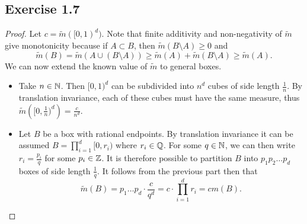 \documentclass[hw_all.tex]{subfiles}
\begin{document}
\subsection{Exercise 1.7}

\begin{proof}
    Let $c = \tilde{m}([0,1)^d)$. Note that finite additivity and non-negativity of $\tilde{m}$ give monotonicity because if $A \subset B$, then $\tilde{m}(B \setminus A) \geq 0$ and 
    \[
        \tilde{m}(B) = \tilde{m}(A \cup (B \setminus A)) \geq \tilde{m}(A) + \tilde{m}(B \setminus A) \geq \tilde{m}(A)
    .\]
    We can now extend the known value of $\tilde{m}$ to general boxes.
    \begin{itemize}
        \item 
            Take $n \in \mathbb{N}$. Then $[0,1)^d$ can be subdivided into $n^d$ cubes of side length $\frac{1}{n}$. By translation invariance, each of these cubes must have the same measure, thus $\tilde{m} \left([0, \frac{1}{n})^d\right) = \frac{c}{n^d}$. 

        \item
            Let $B$ be a box with rational endpoints. By translation invariance it can be assumed $B = \prod_{i=1}^d [0, r_i)$ where $r_i \in \mathbb{Q}$. For some $q \in \mathbb{N}$, we can then write $r_i = \frac{p_i}{q}$ for some $p_i \in \mathbb{Z}$. It is therefore possible to partition $B$ into $p_1 p_2 \ldots p_d$ boxes of side length $\frac{1}{q}$. It follows from the previous part then that 
            \[
            \tilde{m}(B) = p_1 \ldots p_d \cdot \frac{c}{q^d} = c \cdot \prod_{i=1}^d r_i = c m(B)
            .\]


\end{itemize}
\end{proof}
\end{document}

